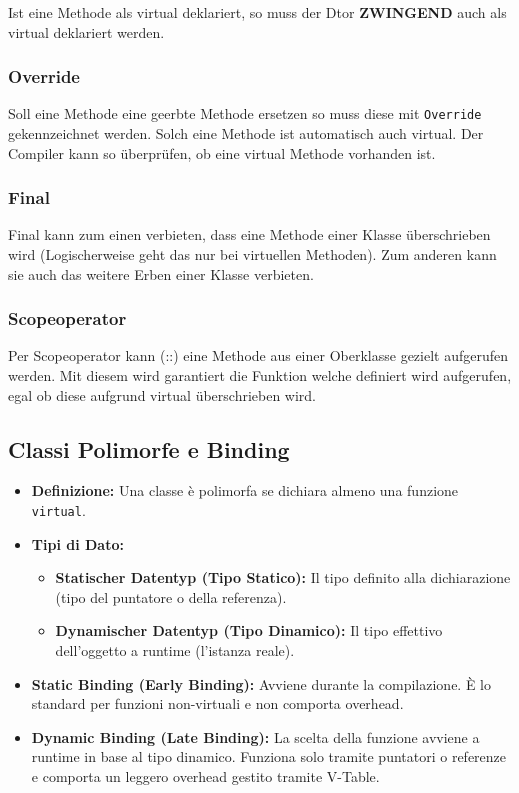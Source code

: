 Ist eine Methode als virtual deklariert, so muss der Dtor \textbf{ZWINGEND} auch als virtual deklariert werden.

\subsubsection{Override}

Soll eine Methode eine geerbte Methode ersetzen so muss diese mit \texttt{Override} gekennzeichnet werden. 
Solch eine Methode ist automatisch auch virtual.
Der Compiler kann so überprüfen, ob eine virtual Methode vorhanden ist.

\subsubsection{Final}

Final kann zum einen verbieten, dass eine Methode einer Klasse überschrieben wird
(Logischerweise geht das nur bei virtuellen Methoden). 
Zum anderen kann sie auch das weitere Erben einer Klasse verbieten. 

\subsubsection{Scopeoperator}

Per Scopeoperator kann (::) eine Methode aus einer Oberklasse gezielt aufgerufen werden. 
Mit diesem wird garantiert die Funktion welche definiert wird aufgerufen, egal ob diese aufgrund virtual überschrieben wird. 


\subsection{Classi Polimorfe e Binding}

\begin{itemize}
    \item \textbf{Definizione:} Una classe è polimorfa se dichiara almeno una funzione \lstinline|virtual|.
    \item \textbf{Tipi di Dato:}
    \begin{itemize}
        \item \textbf{Statischer Datentyp (Tipo Statico):} Il tipo definito alla dichiarazione (tipo del puntatore o della referenza).
        \item \textbf{Dynamischer Datentyp (Tipo Dinamico):} Il tipo effettivo dell'oggetto a runtime (l'istanza reale).
    \end{itemize}
    \item \textbf{Static Binding (Early Binding):} Avviene durante la compilazione. È lo standard per funzioni non-virtuali e non comporta overhead.
    \item \textbf{Dynamic Binding (Late Binding):} La scelta della funzione avviene a runtime in base al tipo dinamico. Funziona solo tramite puntatori o referenze e comporta un leggero overhead gestito tramite V-Table.
\end{itemize}

